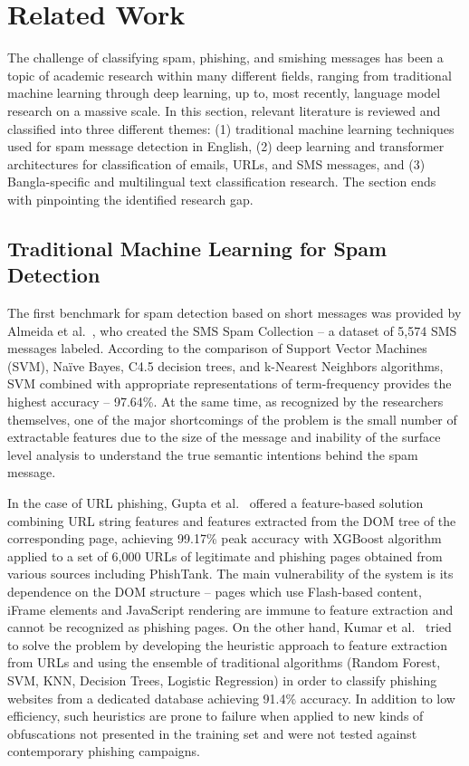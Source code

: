 \documentclass[journal]{IEEEtran}
\begin{document}
\section{Related Work}

The challenge of classifying spam, phishing, and smishing messages has been a topic of academic research within many different fields, ranging from traditional machine learning through deep learning, up to, most recently, language model research on a massive scale. In this section, relevant literature is reviewed and classified into three different themes: (1) traditional machine learning techniques used for spam message detection in English, (2) deep learning and transformer architectures for classification of emails, URLs, and SMS messages, and (3) Bangla-specific and multilingual text classification research. The section ends with pinpointing the identified research gap.

\subsection{Traditional Machine Learning for Spam Detection}

The first benchmark for spam detection based on short messages was provided by Almeida et al.~\cite{ref1}, who created the SMS Spam Collection -- a dataset of 5,574 SMS messages labeled. According to the comparison of Support Vector Machines (SVM), Naïve Bayes, C4.5 decision trees, and k-Nearest Neighbors algorithms, SVM combined with appropriate representations of term-frequency provides the highest accuracy -- 97.64\%. At the same time, as recognized by the researchers themselves, one of the major shortcomings of the problem is the small number of extractable features due to the size of the message and inability of the surface level analysis to understand the true semantic intentions behind the spam message.

In the case of URL phishing, Gupta et al.~\cite{ref2} offered a feature-based solution combining URL string features and features extracted from the DOM tree of the corresponding page, achieving 99.17\% peak accuracy with XGBoost algorithm applied to a set of 6,000 URLs of legitimate and phishing pages obtained from various sources including PhishTank. The main vulnerability of the system is its dependence on the DOM structure -- pages which use Flash-based content, iFrame elements and JavaScript rendering are immune to feature extraction and cannot be recognized as phishing pages. On the other hand, Kumar et al.~\cite{ref8} tried to solve the problem by developing the heuristic approach to feature extraction from URLs and using the ensemble of traditional algorithms (Random Forest, SVM, KNN, Decision Trees, Logistic Regression) in order to classify phishing websites from a dedicated database achieving 91.4\% accuracy. In addition to low efficiency, such heuristics are prone to failure when applied to new kinds of obfuscations not presented in the training set and were not tested against contemporary phishing campaigns.
\end{document}
